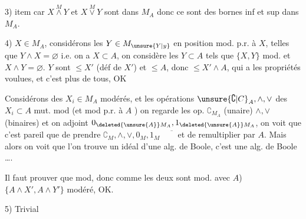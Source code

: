 3) item car  $X\overset{M}{\wedge}Y$ et $X\overset{M}{\vee}Y$ sont dans $M_A$ donc ce sont des bornes inf et sup dans $M_A$.

4)  $X\in M_A$, considérons les $Y\in M_{\unsure{Y|y}}$ en position mod. p.r. à $X$, telles que $Y\wedge X=\varnothing$ i.e.  on a $X\subset A$, on considère les $Y\subset A$ tels que $\{X,Y\}$ mod. et $X\wedge Y=\varnothing$.  $Y$ sont $\leq X'$ (déf de $X'$) et $\leq A$, donc $\leq X'\wedge A$, qui a les propriétés voulues, et c'est  plus  de tous, OK

Considérons des $X_i\in M_A$  modérés, et les opérations $\unsure{\complement|C}_A,\wedge,\vee$   des $X_i\subset A$ mut. mod (et mod p.r. à $A$ ) on regarde les op.
  $\complement_{M_A}$ (unaire) $\wedge,\vee$ (binaires) et on adjoint $0_{\deleted{\unsure{A}}M_A},1_{\deleted{\unsure{A}}M_A}$, on voit que c'est pareil que
 de prendre $\complement_M,\wedge,\vee,0_M,1_M\quad\overline{\phantom X}$ et de remultiplier par $A$. Mais
alors on voit que l'on trouve un idéal d'une alg. de Boole, c'est une alg. de Boole \ldots.

 Il faut prouver que
mod, donc comme  les deux  sont mod. avec $A$) $\{A\wedge X',A\wedge Y'\}$ modéré, OK.

5) Trivial

